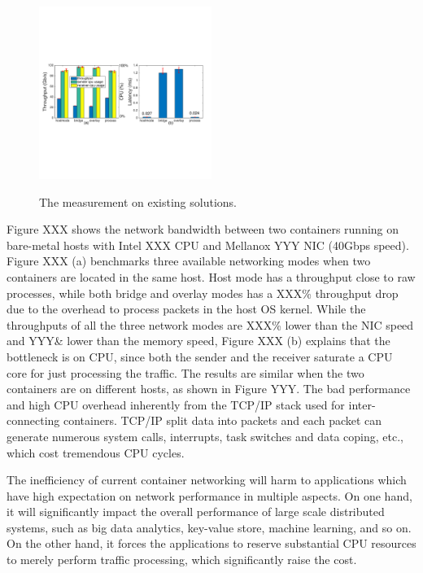 \begin{figure}[ht]
     \centering 
     \includegraphics[width=0.5\textwidth]{figures/intro/intro_exist2.pdf} 
     \label{fig:intro_exist}
     \caption{The measurement on existing solutions.} 
\end{figure} 

Figure XXX shows
the network bandwidth between two containers running on bare-metal hosts with 
Intel XXX CPU and Mellanox YYY NIC (40Gbps speed). Figure XXX (a) benchmarks
three available networking modes when two containers are located in the same 
host. Host mode has a throughput close to raw processes, while both bridge
and overlay modes has a XXX\% throughput drop due to the overhead to 
process packets in the host OS kernel. While the throughputs of all the three
network modes are XXX\% lower than the NIC speed and YYY\& lower than the memory
speed, Figure XXX (b) explains that the bottleneck is on CPU, since both
the sender and the receiver saturate a CPU core for just processing the traffic.
The results are similar when the two containers are on different hosts, as shown
in Figure YYY. The bad performance and high CPU overhead inherently from 
the TCP/IP stack used for inter-connecting containers. TCP/IP split data into 
packets and each packet can generate numerous system calls, interrupts, task 
switches and data coping, etc., which cost tremendous CPU cycles.

The inefficiency of current container networking will harm to applications which
have high expectation on network performance in multiple aspects. On one hand,
it will significantly impact the overall performance of large scale distributed systems, such as big data analytics, key-value store, machine learning, and so on.
On the other hand, it forces the applications to reserve substantial CPU
resources to merely perform traffic processing, which significantly raise the 
cost.

